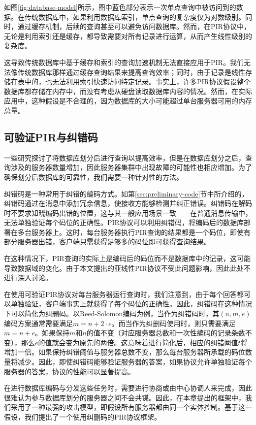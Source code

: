 如图\ref{fig:database-model}所示，图中蓝色部分表示一次单点查询中被访问到的数据。在传统数据库中，如果利用数据库索引，单点查询的复杂度仅为对数级别。同时，通过缓存机制，后续的查询甚至可以避免访问数据库。然而，在PIR协议中，无论是利用索引还是缓存，都导致需要对所有记录进行运算，从而产生线性级别的复杂度。

这导致传统数据库中基于缓存和索引的查询加速机制无法直接应用于PIR。我们无法像传统数据库那样通过缓存查询结果来提高查询效率；同时，由于记录是线性存储在表中的，也无法利用索引快速访问特定记录。事实上，许多PIR协议\cite{SimplePIR,VeriSimplePIR,APIR,USENIX:KogCor21,EC:CorKog20,EC:CorHenKog22,MIR23}假设整个数据库都存储在内存中，而没有考虑从硬盘读取数据库内容的情况。然而，在实际应用中，这种假设是不合理的，因为数据库的大小可能超过单台服务器可用的内存总量。

\subsection{可验证PIR与纠错码}
一些研究探讨了将数据库划分后进行查询以提高效率\cite{RAID-PIR}，但是在数据库划分之后，查询涉及的服务器数量增加，因此服务器集群中出现故障的可能性也相应增加。为了确保划分后数据库的可靠性，我们需要一种针对性的方法。

纠错码是一种常用于纠错的编码方式。如第\ref{sec:preliminary-code}节中所介绍的，纠错码通过在消息中添加冗余信息，使接收方能够检测并纠正错误。纠错码在解码时不要求知晓编码出错的位置，这与其一般应用场景一致——在普通消息传输中，无法单独验证每个码位的正确性。PIR协议可以利用纠错码，将编码后的数据库部署在多台服务器上。这时，每台服务器执行PIR查询的结果都是一个码位，即使有部分服务器出错，客户端只需获得足够多的码位即可获得查询结果。

在这种情况下，PIR查询的实际上是编码后的码位而不是数据库中的记录，这可能导致数据域的变化。由于本文提出的亚线性PIR协议不受此问题影响，因此此处不进行深入讨论。

在使用可验证PIR协议对每台服务器运行查询时，我们注意到，由于每个回答都可以单独验证，客户端事实上就获得了每个码位的正确性。因此，纠错码在这种情况下可以简化为纠删码。以Reed-Solomon编码为例，当作为纠错码时，其$(n, m, e)$编码方案通常需要满足$m = n + 2 \cdot e$。而当作为纠删码使用时，则只需要满足$m = n + e$。如果保持$m$和$n$的值不变（对应服务器总数和一次性编码的记录条数不变），那么$e$的值就会变为原先的两倍。这意味着进行简化后，相应的纠错阈值$t$将增加一倍。如果保持纠错阈值与服务器总数不变，那么每台服务器所承载的码位数量将减少。因此，即使纠错码能够验证服务器的答案，如果协议允许单独验证每个服务器的答案，协议的性能可以显著提高。

\label{sec:framework-assumption}
在进行数据库编码与分发这些任务时，需要进行协商或由中心协调人来完成，因此很难认为参与数据库划分的服务器之间不会共谋。因此，在本章提出的框架中，我们采用了一种最强的攻击模型，即假设所有服务器都由同一个实体控制。基于这一假设，我们提出了一个使用纠删码的PIR协议框架。